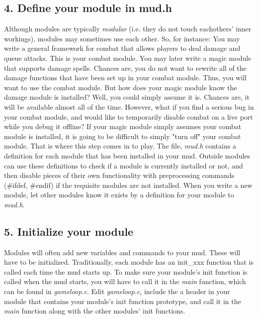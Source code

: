 \documentclass[fignum,doc]{article}
\begin{document}
\begin{doublespace}
\subsection{4. Define your module in mud.h}
Although modules are typically {\it modular} (i.e. they do not touch eachothers' inner workings), modules may sometimes use each other. So, for instance: You may write a general framework for combat that allows players to deal damage and queue attacks. This is your combat module. You may later write a magic module that supports damage spells. Chances are, you do not want to rewrite all of the damage functions that have been set up in your combat module. Thus, you will want to use the combat module. But how does your magic module know the damage module is installed? Well, you could simply assume it is. Chances are, it will be available almost all of the time. However, what if you find a serious bug in your combat module, and would like to temporarily disable combat on a live port while you debug it offline? If your magic module simply assumes your combat module is installed, it is going to be difficult to simply "turn off" your combat module. That is where this step comes in to play. The file, {\it mud.h} contains a definition for each module that has been installed in your mud. Outside modules can use these definitions to check if a module is currently installed or not, and then disable pieces of their own functionality with preprocessing commands (\#ifdef, \#endif) if the requisite modules are not installed. When you write a new module, let other modules know it exists by a definition for your module to {\it mud.h}.



\subsection{5. Initialize your module}
Modules will often add new variables and commands to your mud. These will have to be initialized. Traditionally, each module has an init\_xxx function that is called each time the mud starts up. To make sure your module's init function is called when the mud starts, you will have to call it in the {\it main} function, which can be found in {\it gameloop.c}. Edit {\it gameloop.c}, include the a header in your module that contains your module's init function prototype, and call it in the {\it main} function along with the other modules' init functions.




\end{doublespace}
\end{document}
